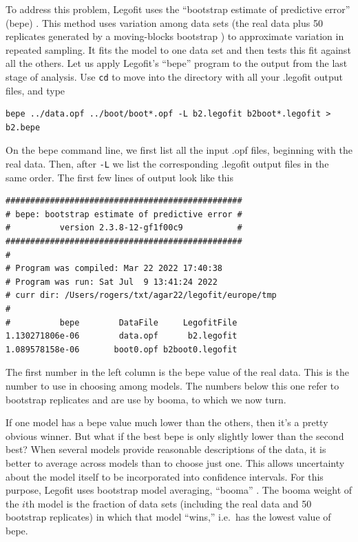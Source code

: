 \documentclass[11pt]{article}
\begin{document}
To address this problem, Legofit uses the ``bootstrap estimate of
predictive error'' (bepe)
\citep{Rogers:BMC-20-526,Efron:JAS-78-316,Efron:IB-93}. This method
uses variation among data sets (the real data plus 50 replicates
generated by a moving-blocks bootstrap \citep{Liu:ELB-92-225}) to
approximate variation in repeated sampling. It fits the model to one
data set and then tests this fit against all the others. Let us apply
Legofit's ``bepe'' program to the output from the last stage of
analysis. Use \texttt{cd} to move into the directory with all your
.legofit output files, and type
\begin{verbatim}
bepe ../data.opf ../boot/boot*.opf -L b2.legofit b2boot*.legofit > b2.bepe
\end{verbatim}
On the bepe command line, we first list all the input .opf files,
beginning with the real data. Then, after \texttt{-L} we list the
corresponding .legofit output files in the same order. The first few
lines of output look like this
\begin{verbatim}
################################################
# bepe: bootstrap estimate of predictive error #
#          version 2.3.8-12-gf1f00c9           #
################################################
#
# Program was compiled: Mar 22 2022 17:40:38
# Program was run: Sat Jul  9 13:41:24 2022
# curr dir: /Users/rogers/txt/agar22/legofit/europe/tmp
#
#          bepe        DataFile     LegofitFile
1.130271806e-06        data.opf      b2.legofit
1.089578158e-06       boot0.opf b2boot0.legofit
\end{verbatim}
The first number in the left column is the bepe value of the real
data. This is the number to use in choosing among models. The numbers
below this one refer to bootstrap replicates and are use by booma,
to which we now turn.

If one model has a bepe value much lower than the others, then it's a
pretty obvious winner. But what if the best bepe is only slightly
lower than the second best? When several models provide reasonable
descriptions of the data, it is better to average across models than
to choose just one. This allows uncertainty about the model itself to
be incorporated into confidence intervals. For this purpose, Legofit
uses bootstrap model averaging, ``booma''
\citep{Buckland:B-53-603,Rogers:BMC-20-526}. The booma weight of the
$i$th model is the fraction of data sets (including the real data and
50 bootstrap replicates) in which that model ``wins,'' i.e.\ has the
lowest value of bepe.
\end{document}
